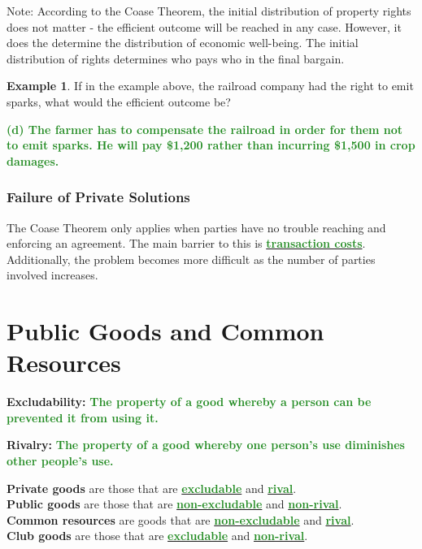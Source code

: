 \documentclass[11pt]{article}\usepackage[]{graphicx}\usepackage[]{color}
\theoremstyle{definition}
\newtheorem{exmp}{Example}[section]
\newcommand{\ddp}[1]{{\textbf{\textcolor{ForestGreen}{#1}}}}
\newcommand{\dd}[1]{{\underline{\textbf{\textcolor{ForestGreen}{#1}}}}}
\newcommand{\defn}[1]{\textbf{#1}}
\begin{document}
	Note: According to the Coase Theorem, the initial distribution of property rights does not matter - the efficient outcome will be reached in any case. However, it does the determine the distribution of economic well-being. The initial distribution of rights determines who pays who in the final bargain.
	
	\begin{exmp}
		If in the example above, the railroad company had the right to emit sparks, what would the efficient outcome be?
	\end{exmp} 
	\ddp{(d) The farmer has to compensate the railroad in order for them not to emit sparks. He will pay \$1,200 rather than incurring \$1,500 in crop damages.}
	
	\subsubsection*{Failure of Private Solutions}
	
	The Coase Theorem only applies when parties have no trouble reaching and enforcing an agreement. The main barrier to this is \dd{transaction costs}. Additionally, the problem becomes more difficult as the number of parties involved increases.
	
	\newpage
	
	\section{Public Goods and Common Resources}
	
	\defn{Excludability:} \ddp{The property of a good whereby a person can be prevented it from using it. \\}
	
	
	\defn{Rivalry:} \ddp{The property of a good whereby one person's use diminishes other people's use.\\}
	
	
	\textbf{Private goods} are those that are \dd{excludable} and \dd{rival}.
	\\
	
	\textbf{Public goods} are those that are \dd{non-excludable} and \dd{non-rival}.
	\\
	
	\textbf{Common resources} are goods that are \dd{non-excludable} and \dd{rival}.
	\\
	
	\textbf{Club goods} are those that are \dd{excludable} and \dd{non-rival}.
	\\
	
\end{document}
